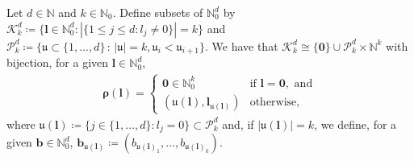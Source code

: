 \documentclass[10pt,a4paper]{amsart}
\begin{document}
\begin{lemma}\label{lem: bijection}
    Let \(d\in\mathbb{N}\) and \(k\in\mathbb{N}_0\). Define subsets of \(\mathbb{N}_0^d\) by \(\mathcal{K}^d_k\coloneqq\{\boldsymbol{l}\in\mathbb{N}_{0}^d:|\{1\leq j\leq d:l_j\neq0\}|=k\}\) and \(\mathcal{P}^d_k\coloneqq\{\mathfrak{u}\subset\{1,\dots,d\}\,:\,|\mathfrak{u}|=k, \mathfrak{u}_i<\mathfrak{u}_{i+1}\}\). We have that \(\mathcal{K}_k^d\cong\{\mathbf{0}\}\cup\mathcal{P}^d_k\times\mathbb{N}^k\) with bijection, for a given \(\boldsymbol{l}\in\mathbb{N}_0^d\),
    \begin{align}
        \boldsymbol{\rho}(\boldsymbol{l}) = \begin{cases}
            \mathbf{0}\in\mathbb{N}_0^k&\textrm{if }\boldsymbol{l}=\mathbf{0}, \textrm{ and}\\
            \left(\mathfrak{u}(\boldsymbol{l}),\boldsymbol{l}_{\mathfrak{u}(\boldsymbol{l})}\right)&\textrm{otherwise},
            \end{cases}\nonumber
    \end{align}
    where \(\mathfrak{u}(\boldsymbol{l})\coloneqq\{j\in\{1,\dots,d\}:l_j=0\}\subset\mathcal{P}^d_k\) and, if \(|\mathfrak{u}(\boldsymbol{l})|=k\), we define, for a given \(\mathbf{b}\in\mathbb{N}_0^d\), \(\mathbf{b}_{\mathfrak{u}(\boldsymbol{l})}\coloneqq(b_{\mathfrak{u}(\boldsymbol{l})_1},\dots,b_{\mathfrak{u}(\boldsymbol{l})_k})\).
\end{lemma}
\end{document}
